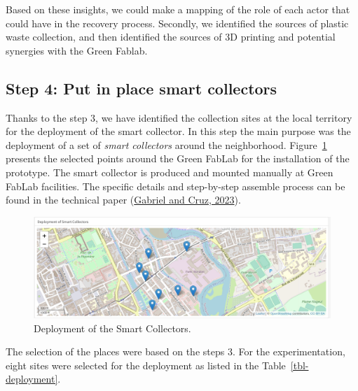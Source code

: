 \documentclass[
  11pt,
]{article}
\begin{document}
Based on these insights, we could make a mapping of the role of each
actor that could have in the recovery process. Secondly, we identified
the sources of plastic waste collection, and then identified the sources
of 3D printing and potential synergies with the Green Fablab.

\hypertarget{step-4-put-in-place-smart-collectors}{%
\subsection{Step 4: Put in place smart
collectors}\label{step-4-put-in-place-smart-collectors}}

Thanks to the step 3, we have identified the collection sites at the
local territory for the deployment of the smart collector. In this step
the main purpose was the deployment of a set of \emph{smart collectors}
around the neighborhood. Figure~\ref{fig-sc-deployment} presents the
selected points around the Green FabLab for the installation of the
prototype. The smart collector is produced and mounted manually at Green
FabLab facilities. The specific details and step-by-step assemble
process can be found in the technical paper
(\protect\hyperlink{ref-gabriel2023}{Gabriel and Cruz, 2023}).

\begin{figure}[H]

{\centering \includegraphics[width=6.25in,height=\textheight]{figures/SC/Deployment.jpg}

}

\caption{\label{fig-sc-deployment}Deployment of the Smart Collectors.}

\end{figure}

The selection of the places were based on the steps 3. For the
experimentation, eight sites were selected for the deployment as listed
in the Table~\ref{tbl-deployment}.
\end{document}
